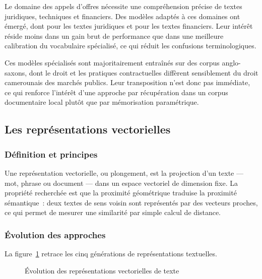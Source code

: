 Le domaine des appels d'offres nécessite une compréhension précise de textes
juridiques, techniques et financiers. Des modèles adaptés à ces domaines ont
émergé, dont  pour les textes juridiques et
 pour les textes financiers. Leur intérêt réside moins dans un
gain brut de performance que dans une meilleure calibration du vocabulaire
spécialisé, ce qui réduit les confusions terminologiques.

\begin{btpwarn}
Ces modèles spécialisés sont majoritairement entraînés sur des corpus
anglo-saxons, dont le droit et les pratiques contractuelles diffèrent
sensiblement du droit camerounais des marchés publics. Leur transposition n'est
donc pas immédiate, ce qui renforce l'intérêt d'une approche par récupération
dans un corpus documentaire local plutôt que par mémorisation paramétrique.
\end{btpwarn}

\subsection{Les représentations vectorielles}

\subsubsection{Définition et principes}

Une représentation vectorielle, ou plongement, est la projection d'un texte —
mot, phrase ou document — dans un espace vectoriel de dimension fixe. La
propriété recherchée est que la proximité géométrique traduise la proximité
sémantique~: deux textes de sens voisin sont représentés par des vecteurs
proches, ce qui permet de mesurer une similarité par simple calcul de distance.

\subsubsection{Évolution des approches}

La figure~\ref{fig:evolution-representations} retrace les cinq générations de
représentations textuelles.

\begin{figure}[htbp]
  \centering
  \resizebox{\linewidth}{!}{}
  \caption{Évolution des représentations vectorielles de texte}
  \label{fig:evolution-representations}
\end{figure}

